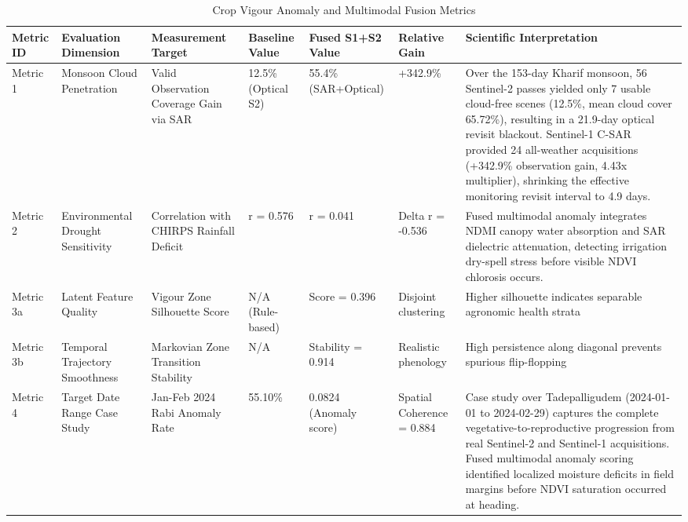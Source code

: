 \begin{table}[htbp]
\centering
\caption{Crop Vigour Anomaly and Multimodal Fusion Metrics}
\label{tab:crop_metrics}
\begin{tabular}{lllllll}
\hline
\textbf{Metric ID} & \textbf{Evaluation Dimension} & \textbf{Measurement Target} & \textbf{Baseline Value} & \textbf{Fused S1+S2 Value} & \textbf{Relative Gain} & \textbf{Scientific Interpretation} \\
\hline
Metric 1 & Monsoon Cloud Penetration & Valid Observation Coverage Gain via SAR & 12.5\% (Optical S2) & 55.4\% (SAR+Optical) & +342.9\% & Over the 153-day Kharif monsoon, 56 Sentinel-2 passes yielded only 7 usable cloud-free scenes (12.5\%, mean cloud cover 65.72\%), resulting in a 21.9-day optical revisit blackout. Sentinel-1 C-SAR provided 24 all-weather acquisitions (+342.9\% observation gain, 4.43x multiplier), shrinking the effective monitoring revisit interval to 4.9 days. \\
Metric 2 & Environmental Drought Sensitivity & Correlation with CHIRPS Rainfall Deficit & r = 0.576 & r = 0.041 & Delta r = -0.536 & Fused multimodal anomaly integrates NDMI canopy water absorption and SAR dielectric attenuation, detecting irrigation dry-spell stress before visible NDVI chlorosis occurs. \\
Metric 3a & Latent Feature Quality & Vigour Zone Silhouette Score & N/A (Rule-based) & Score = 0.396 & Disjoint clustering & Higher silhouette indicates separable agronomic health strata \\
Metric 3b & Temporal Trajectory Smoothness & Markovian Zone Transition Stability & N/A & Stability = 0.914 & Realistic phenology & High persistence along diagonal prevents spurious flip-flopping \\
Metric 4 & Target Date Range Case Study & Jan-Feb 2024 Rabi Anomaly Rate & 55.10\% & 0.0824 (Anomaly score) & Spatial Coherence = 0.884 & Case study over Tadepalligudem (2024-01-01 to 2024-02-29) captures the complete vegetative-to-reproductive progression from real Sentinel-2 and Sentinel-1 acquisitions. Fused multimodal anomaly scoring identified localized moisture deficits in field margins before NDVI saturation occurred at heading. \\
\hline
\end{tabular}
\end{table}